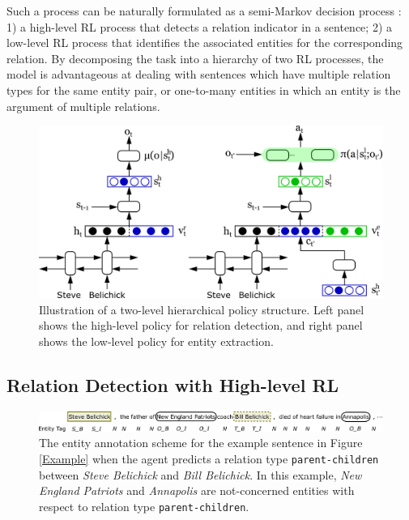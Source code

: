 \documentclass[letterpaper]{article}
\theoremstyle{definition}
\begin{document}
Such a process can be naturally formulated as a semi-Markov decision process \cite{sutton1999between}: 1) a high-level RL process that detects a relation indicator in a sentence; 2) a low-level RL process that identifies the associated entities for the corresponding relation.
By decomposing the task into a hierarchy of two RL processes, the model is advantageous at dealing with sentences which have multiple relation types for the same entity pair, or one-to-many entities in which an entity is the argument of multiple relations.


\begin{figure}[!hptb]
    \centering
    \includegraphics[width=\linewidth]{high-low.png}
    \caption{Illustration of a two-level hierarchical policy structure. Left panel shows the high-level policy for relation detection, and right panel shows the low-level policy for entity extraction.}
    \label{policy}
\end{figure}

\subsection{Relation Detection with High-level RL}

\begin{figure}[!tpb]
    \centering
    \includegraphics[width=\linewidth]{annotation.png}
    \caption{The entity annotation scheme for the example sentence in Figure \ref{Example} when the agent predicts a relation type \texttt{parent-children} between \textit{Steve Belichick} and \textit{Bill Belichick}. In this example, \textit{New England Patriots} and \textit{Annapolis} are not-concerned entities with respect to relation type \texttt{parent-children}.
    }
    \label{tag}
\end{figure}
\end{document}
